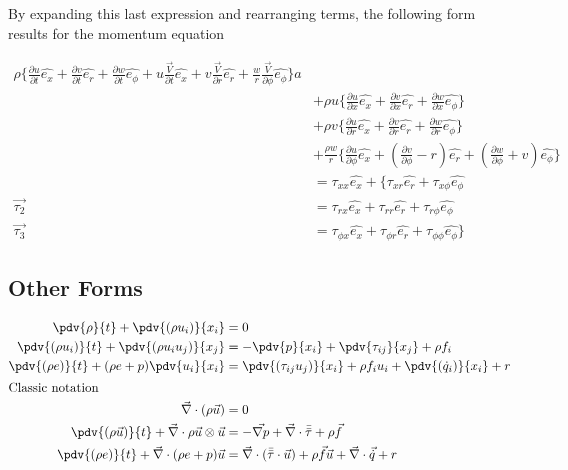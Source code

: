 By expanding this last expression and rearranging terms, the following form
results for the momentum equation

\begin{equation}
  \begin{aligned}
\rho \bigg\{ 
      \frac{\partial u}{\partial t}\hat{e_x} 
    + \frac{\partial v}{\partial t}\hat{e_r}
    + \frac{\partial w}{\partial t}\hat{e_\phi} 
    + u\frac{\overrightarrow{V}}{\partial t}\hat{e_x}
    + v\frac{\overrightarrow{V}}{\partial r}\hat{e_r}
    + \frac{w}{r}\frac{\overrightarrow{V}}{\partial \phi}\hat{e_\phi}
  \bigg\}a \\
    &+ \rho u \bigg\{
    \frac{\partial u}{\partial x}\hat{e_x} 
    + \frac{\partial v}{\partial x}\hat{e_r}
    + \frac{\partial w}{\partial x}\hat{e_\phi} \bigg\}\\
  &+ \rho v \bigg\{
    \frac{\partial u}{\partial r}\hat{e_x} 
    + \frac{\partial v}{\partial r}\hat{e_r}
    + \frac{\partial w}{\partial r}\hat{e_\phi} \bigg\}\\
  &+ \frac{\rho w}{r} \bigg\{
    \frac{\partial u}{\partial \phi}\hat{e_x} 
    + \left(\frac{\partial v}{\partial \phi}-r\right)\hat{e_r}
    + \left(\frac{\partial w}{\partial \phi}+v\right)\hat{e_\phi} \bigg\} \\
  &= \tau_{xx}\hat{e_x}
    + \bigg\{\tau_{xr}\hat{e_r}
    + \tau_{x\phi}\hat{e_\phi} \\
     \overrightarrow{\tau_2} 
    &= \tau_{rx}\hat{e_x}
    + \tau_{rr}\hat{e_r}
    + \tau_{r\phi}\hat{e_\phi} \\
     \overrightarrow{\tau_3} 
    &= \tau_{\phi x}\hat{e_x}
    + \tau_{\phi r}\hat{e_r}
    + \tau_{\phi\phi}\hat{e_\phi} \bigg\}
  \end{aligned}
\end{equation}

\subsection{Other Forms}
\begin{align}
      \pdv{\rho}{t}+\pdv{(\rho u_i)}{x_i} &= 0 \\
      \pdv{(\rho u_i)}{t}+\pdv{(\rho u_i u_j)}{x_j} &= -\pdv{p}{x_i}+\pdv{\tau_{ij}}{x_j}+\rho f_i \\
      \pdv{(\rho e)}{t}+(\rho e+p)\pdv{u_i}{x_i} &= \pdv{(\tau_{ij} u_j)}{x_i}+\rho f_i u_i+\pdv{(\dot{q}_i)}{x_i}+r \\
      \intertext{Classic notation}
      \vec{\nabla}\cdot(\rho\vec{u}) &= 0 \\
      \pdv{(\rho \vec{u})}{t}+\vec{\nabla}\cdot\rho\vec{u}\otimes\vec{u} &= -\vec{\nabla p}+\vec{\nabla}\cdot\Bar{\Bar{\tau}}+\rho\vec{f} \\
      \pdv{(\rho e)}{t}+\vec{\nabla}\cdot(\rho e+p)\vec{u} &= \vec{\nabla}\cdot(\Bar{\Bar{\tau}}\cdot\vec{u})+\rho\vec{f}\vec{u}+\vec{\nabla}\cdot\vec{\dot{q}}+r 
\end{align}

